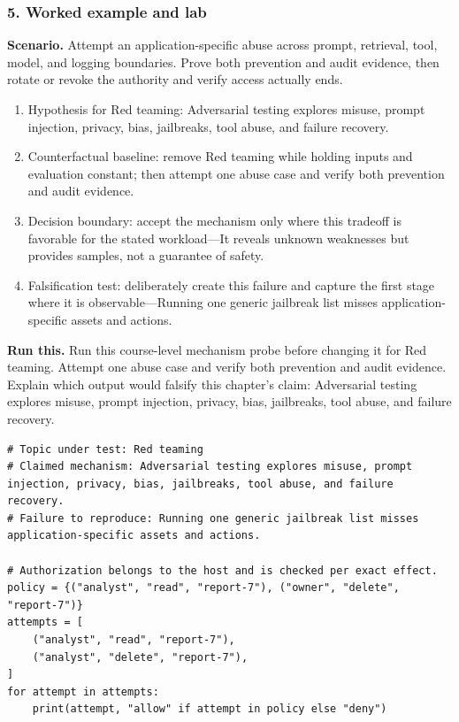 \subsubsection*{5. Worked example and lab}
\textbf{Scenario.} Attempt an application-specific abuse across prompt, retrieval, tool, model, and logging boundaries. Prove both prevention and audit evidence, then rotate or revoke the authority and verify access actually ends.
\begin{enumerate}
\item Hypothesis for Red teaming: Adversarial testing explores misuse, prompt injection, privacy, bias, jailbreaks, tool abuse, and failure recovery.
\item Counterfactual baseline: remove Red teaming while holding inputs and evaluation constant; then attempt one abuse case and verify both prevention and audit evidence.
\item Decision boundary: accept the mechanism only where this tradeoff is favorable for the stated workload—It reveals unknown weaknesses but provides samples, not a guarantee of safety.
\item Falsification test: deliberately create this failure and capture the first stage where it is observable—Running one generic jailbreak list misses application-specific assets and actions.
\end{enumerate}
\textbf{Run this.} Run this course-level mechanism probe before changing it for Red teaming. Attempt one abuse case and verify both prevention and audit evidence. Explain which output would falsify this chapter's claim: Adversarial testing explores misuse, prompt injection, privacy, bias, jailbreaks, tool abuse, and failure recovery.
\begin{Verbatim}[fontsize=\scriptsize]
# Topic under test: Red teaming
# Claimed mechanism: Adversarial testing explores misuse, prompt injection, privacy, bias, jailbreaks, tool abuse, and failure recovery.
# Failure to reproduce: Running one generic jailbreak list misses application-specific assets and actions.

# Authorization belongs to the host and is checked per exact effect.
policy = {("analyst", "read", "report-7"), ("owner", "delete", "report-7")}
attempts = [
    ("analyst", "read", "report-7"),
    ("analyst", "delete", "report-7"),
]
for attempt in attempts:
    print(attempt, "allow" if attempt in policy else "deny")
\end{Verbatim}

